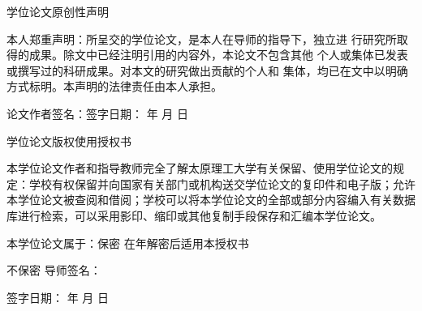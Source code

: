 \begingroup
\thispagestyle{empty}%
\fontsize{14bp}{20pt}\selectfont
\null\par
\vskip 4bp%
\begin{center}
	\sffamily\sanhao 学位论文原创性声明
\end{center}%
\vskip 18bp%

本人郑重声明：所呈交的学位论文，是本人在导师的指导下，独立进
行研究所取得的成果。除文中已经注明引用的内容外，本论文不包含其他
个人或集体已发表或撰写过的科研成果。对本文的研究做出贡献的个人和
集体，均已在文中以明确方式标明。本声明的法律责任由本人承担。\par
\vskip 40pt%
\noindent 论文作者签名：\hfill              签字日期：\hspace{2em} 年\hspace{1em} 月 \hspace{1em} 日\hspace{2em}\null\par

\vskip 4.2cm%

\vskip 4bp%
\begin{center}
	\sffamily\sanhao 学位论文版权使用授权书
\end{center}%
\vskip 18bp%

本学位论文作者和指导教师完全了解太原理工大学有关保留、使用学位论文的规定：学校有权保留并向国家有关部门或机构送交学位论文的复印件和电子版；允许本学位论文被查阅和借阅；学校可以将本学位论文的全部或部分内容编入有关数据库进行检索，可以采用影印、缩印或其他复制手段保存和汇编本学位论文。\par
\vskip 20pt%
本学位论文属于：保密\hspace{.5em} \raisebox{.15ex}{$\square$} \hspace{2em} 在\underline{\smash{\makebox[3em][l]{\null}}}年解密后适用本授权书\par
\vskip 20pt%
\hspace{3.58cm} 不保密 \raisebox{.15ex}{$\square$}
\vskip 40pt%
\noindent{} 导师签名：\par
\vskip 20pt%
\noindent{} 签字日期：\hspace{2em} 年\hspace{1em} 月 \hspace{1em} 日\par
\endgroup
